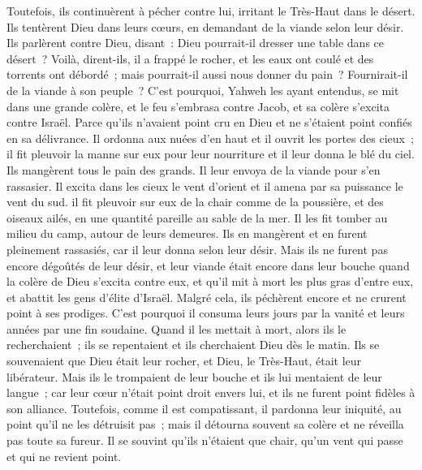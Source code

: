 \begin{multicols}{2}
Toutefois, ils continuèrent à pécher contre lui, irritant le Très-Haut dans le désert.
Ils tentèrent Dieu dans leurs cœurs, en demandant de la viande selon leur désir.
Ils parlèrent contre Dieu, disant~: Dieu pourrait-il dresser une table dans ce désert~?
Voilà, dirent-ils, il a frappé le rocher, et les eaux ont coulé et des torrents ont débordé~; mais pourrait-il aussi nous donner du pain~? Fournirait-il de la viande à son peuple~?
C'est pourquoi, Yahweh les ayant entendus, se mit dans une grande colère, et le feu s'embrasa contre Jacob, et sa colère s'excita contre Israël.
Parce qu'ils n'avaient point cru en Dieu et ne s'étaient point confiés en sa délivrance.
Il ordonna aux nuées d'en haut et il ouvrit les portes des cieux~;
il fit pleuvoir la manne sur eux pour leur nourriture et il leur donna le blé du ciel.
Ils mangèrent tous le pain des grands. Il leur envoya de la viande pour s'en rassasier.
Il excita dans les cieux le vent d'orient et il amena par sa puissance le vent du sud.
il fit pleuvoir sur eux de la chair comme de la poussière, et des oiseaux ailés, en une quantité pareille au sable de la mer.
Il les fit tomber au milieu du camp, autour de leurs demeures.
Ils en mangèrent et en furent pleinement rassasiés, car il leur donna selon leur désir.
Mais ils ne furent pas encore dégoûtés de leur désir, et leur viande était encore dans leur bouche
quand la colère de Dieu s'excita contre eux, et qu'il mit à mort les plus gras d'entre eux, et abattit les gens d'élite d'Israël.
Malgré cela, ils péchèrent encore et ne crurent point à ses prodiges.
C'est pourquoi il consuma leurs jours par la vanité et leurs années par une fin soudaine.
Quand il les mettait à mort, alors ils le recherchaient~; ils se repentaient et ils cherchaient Dieu dès le matin.
Ils se souvenaient que Dieu était leur rocher, et Dieu, le Très-Haut, était leur libérateur.
Mais ils le trompaient de leur bouche et ils lui mentaient de leur langue~;
car leur cœur n'était point droit envers lui, et ils ne furent point fidèles à son alliance.
Toutefois, comme il est compatissant, il pardonna leur iniquité, au point qu'il ne les détruisit pas~; mais il détourna souvent sa colère et ne réveilla pas toute sa fureur.
Il se souvint qu'ils n'étaient que chair, qu'un vent qui passe et qui ne revient point.

\end{multicols}
